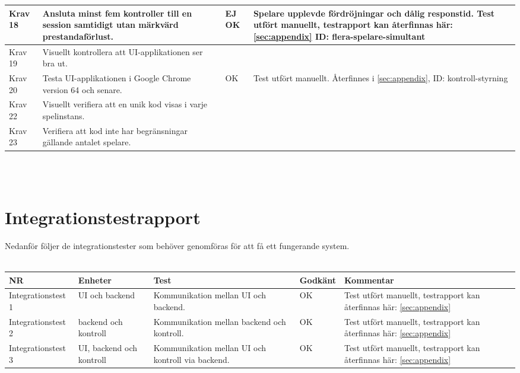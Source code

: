 \documentclass[10pt]{article}
\begin{document}
\begin{tabular}{| p{1.5cm} | p{5cm} | p{1.2cm}| p{7cm}|}
		\hline
		Krav 18&Ansluta minst fem kontroller till en session samtidigt utan märkvärd prestandaförlust.&EJ OK&Spelare upplevde fördröjningar och dålig responstid. Test utfört manuellt, testrapport kan återfinnas här: \ref{sec:appendix} ID: flera-spelare-simultant\\
		\hline
		Krav 19&Visuellt kontrollera att UI-applikationen ser bra ut.&&\\
		\hline
		Krav 20&Testa UI-applikationen i Google Chrome version 64 och senare. &OK&Test utfört manuellt. Återfinnes i \ref{sec:appendix}, ID: kontroll-styrning\\
		\hline
		Krav 22&Visuellt verifiera att en unik kod visas i varje spelinstans.&&\\
		\hline
		Krav 23&Verifiera att kod inte har begränsningar gällande antalet spelare.&& \\
		\hline



  \end{tabular}
  \\
  \\




\section{Integrationstestrapport}
Nedanför följer de integrationstester som behöver genomföras för att få ett fungerande system. \\
\\

\noindent
	\begin{tabular}{| p{2.8cm}| p{2cm} | p{5cm}|p{1.2cm}| p{5cm}|}
      		\hline
      		NR&Enheter&Test&Godkänt&Kommentar\\
      		\hline
		Integrationstest 1&UI och backend&Kommunikation mellan UI och backend.&OK&Test utfört manuellt, testrapport kan återfinnas här: \ref{sec:appendix}\\
		\hline
		Integrationstest 2&backend och kontroll&Kommunikation mellan backend och kontroll.&OK&Test utfört manuellt, testrapport kan återfinnas här: \ref{sec:appendix}\\
		\hline
		Integrationstest 3&UI, backend och kontroll&Kommunikation mellan UI och kontroll via backend.&OK&Test utfört manuellt, testrapport kan återfinnas här: \ref{sec:appendix}\\
		\hline
 	 \end{tabular}
\end{document}
